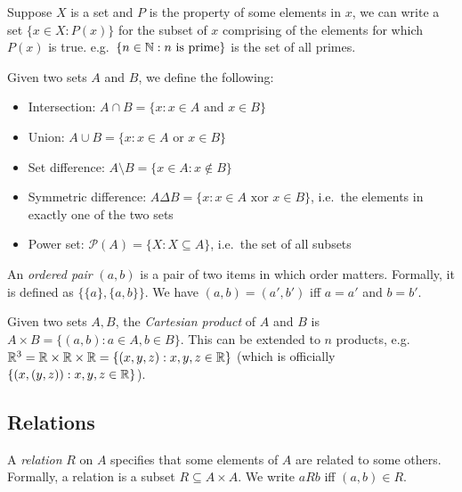 Suppose $X$ is a set and $P$ is the property of some elements in $x$, we can write a set $\{x\in X:P(x)\}$ for the subset of $x$ comprising of the elements for which $P(x)$ is true. e.g.\ $\{n\in \mathbb{N} : n \text{ is prime}\}$ is the set of all primes.

\begin{defi}
Given two sets $A$ and $B$, we define the following:
\begin{itemize}
    \item Intersection: $A\cap B = \{x:x\in A \text{ and } x\in B\}$
    \item Union: $A\cup B = \{x:x\in A\text{ or }x\in B\}$
    \item Set difference: $A\setminus B = \{x\in A: x\not\in B\}$
    \item Symmetric difference: $A\Delta B = \{x: x\in A\text{ xor } x\in B\}$, i.e.\ the elements in exactly one of the two sets
    \item Power set: $\mathcal{P}(A) = \{ X : X\subseteq A\}$, i.e.\ the set of all subsets
\end{itemize}
\end{defi}
\begin{defi}
An \emph{ordered pair} $(a, b)$ is a pair of two items in which order matters. Formally, it is defined as $\{\{a\}, \{a, b\}\}$. We have $(a, b) = (a', b')$ iff $a = a'$ and $b = b'$.
\end{defi}

\begin{defi}
Given two sets $A, B$, the \emph{Cartesian product} of $A$ and $B$ is $A\times B = \{(a, b):a\in A, b\in B\}$. This can be extended to $n$ products, e.g.\ $\mathbb{R}^3 = \mathbb{R}\times\mathbb{R}\times\mathbb{R} = \{(x,y,z): x, y, z\in \mathbb{R}\}$ (which is officially $\{(x, (y, z)): x, y, z\in \mathbb{R}\}$).
\end{defi}

\subsection{Relations}
\begin{defi}[Relation]
  A \emph{relation} $R$ on $A$ specifies that some elements of $A$ are related to some others. Formally, a relation is a subset $R\subseteq A\times A$. We write $aRb$ iff $(a, b)\in R$.
\end{defi}

